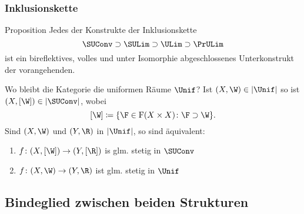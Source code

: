 \begin{frame}
  \frametitle{Inklusionskette}
  \begin{block}{Proposition}
  Jedes der Konstrukte der Inklusionskette
  $$
  \SUConv \supset \SULim \supset \ULim \supset \PrULim
  $$
  ist ein bireflektives, volles und unter Isomorphie abgeschlossenes Unterkonstrukt der vorangehenden.
  \end{block}
  \pause
  \begin{block}{Wo bleibt die Kategorie die uniformen Räume $\Unif$?}
    Ist $(X,\W) \in |\Unif|$ so ist $(X,[\W]) \in |\SUConv|$, wobei
    $$
    [\W] \coloneqq \{\F \in \mathrm{F}(X \times X) \colon \F \supset \W \}.
    $$
    Sind $(X,\W)$ und $(Y,\R)$ in $|\Unif|$, so sind äquivalent:
    \begin{enumerate}[(1)]
      \item $f \colon (X, [\W]) \to (Y, [\R])$ is glm. stetig in $\SUConv$
      \item $f \colon (X,\W) \to (Y,\R)$ ist glm. stetig in $\Unif$
    \end{enumerate}
  \end{block}
\end{frame}

\subsection{Bindeglied zwischen beiden Strukturen}

